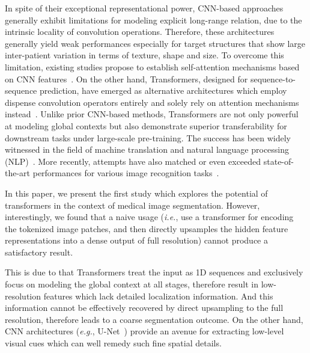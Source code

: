 \documentclass[runningheads]{llncs}
\begin{document}
In spite of their exceptional representational power,  CNN-based approaches generally exhibit limitations for modeling explicit long-range relation, due to the intrinsic locality of convolution operations.
Therefore, these architectures generally yield weak performances especially for target structures that show large inter-patient variation in terms of texture, shape and size.
To overcome this limitation, existing studies propose to establish self-attention mechanisms based on CNN features~\cite{wang2018non,schlemper2019attention}.
On the other hand, Transformers, designed for sequence-to-sequence prediction, have emerged as alternative architectures which employ dispense convolution operators entirely and solely rely on attention mechanisms instead~\cite{vaswani2017attention}. 
Unlike prior CNN-based methods, Transformers are not only powerful at modeling global contexts but also demonstrate superior transferability for downstream tasks under large-scale pre-training.
The success has been widely witnessed in the field of machine translation and natural language processing (NLP)~\cite{vaswani2017attention,devlin2018bert}.
More recently, attempts have also matched or even exceeded state-of-the-art performances for various image recognition tasks~\cite{dosovitskiy2020image,zheng2020rethinking}. 

In this paper, we present the first study which explores the potential of transformers in the context of medical image segmentation. 
However, interestingly, we found that a naive usage ({\em i.e.}, use a transformer for encoding the tokenized image patches, and then directly upsamples the hidden feature representations into a dense output of full resolution) cannot produce a satisfactory result.
 
This is due to that Transformers treat the input as 1D sequences and exclusively focus on modeling the global context at all stages, therefore result in low-resolution features which lack detailed localization information.
And this information cannot be effectively recovered by direct upsampling to the full resolution, therefore leads to a coarse segmentation outcome.
On the other hand, CNN architectures (\emph{e.g.}, U-Net~\cite{ronneberger2015u}) provide an avenue for extracting low-level visual cues which can well remedy such fine spatial details.
\end{document}
